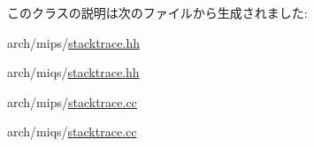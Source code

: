 このクラスの説明は次のファイルから生成されました:\begin{DoxyCompactItemize}
\item 
arch/mips/\hyperlink{mips_2stacktrace_8hh}{stacktrace.hh}\item 
arch/miqs/\hyperlink{miqs_2stacktrace_8hh}{stacktrace.hh}\item 
arch/mips/\hyperlink{mips_2stacktrace_8cc}{stacktrace.cc}\item 
arch/miqs/\hyperlink{miqs_2stacktrace_8cc}{stacktrace.cc}\end{DoxyCompactItemize}
